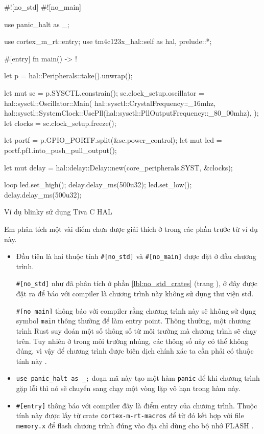 \begin{listing}[ht]
\begin{rustcode}
#![no_std]
#![no_main]

use panic_halt as _;

use cortex_m_rt::entry;
use tm4c123x_hal::{self as hal, prelude::*};

#[entry]
fn main() -> ! {
    let p = hal::Peripherals::take().unwrap();

    let mut sc = p.SYSCTL.constrain();
    sc.clock_setup.oscillator = hal::sysctl::Oscillator::Main(
        hal::sysctl::CrystalFrequency::_16mhz,
        hal::sysctl::SystemClock::UsePll(hal::sysctl::PllOutputFrequency::_80_00mhz),
    );
    let clocks = sc.clock_setup.freeze();

    let portf = p.GPIO_PORTF.split(&sc.power_control);
    let mut led = portf.pf1.into_push_pull_output();

    let mut delay = hal::delay::Delay::new(core_peripherals.SYST, &clocks);

    loop {
        led.set_high();
        delay.delay_ms(500u32);
        led.set_low();
        delay.delay_ms(500u32);
    }
}
\end{rustcode}
\caption{Ví dụ blinky sử dụng Tiva C HAL}
\label{code:tivac_hal_blinky}
\end{listing}

Em phân tích một vài điểm chưa được giải thích ở trong các phần trước từ ví dụ này.

\begin{itemize}
    \item Đầu tiên là hai thuộc tính \texttt{#[no_std]} và \texttt{#[no_main]} được đặt ở đầu chương trình.

        \texttt{#[no_std]} như đã phân tích ở phần \ref{lbl:no_std_crates} (trang \pageref{lbl:no_std_crates}), ở đây được đặt ra để báo với compiler là chương trình này không sử dụng thư viện std.

    \texttt{#[no_main]} thông báo với compiler rằng chương trình này sẽ không sử dụng symbol \texttt{main} thông thường để làm entry point. Thông thường, một chương trình Rust suy đoán một số thông số từ môi trường mà chương trình sẽ chạy trên. Tuy nhiên ở trong môi trường nhúng, các thông số này có thể không đúng, vì vậy để chương trình được biên dịch chính xác ta cần phải có thuộc tính này \cite{rust_reference, embedonomicon}.

    \item \texttt{use panic_halt as _;} đoạn mã này tạo một hàm \texttt{panic} để khi chương trình gặp lỗi thì nó sẽ chuyển sang chạy một vòng lặp vô hạn trong hàm này.
    \item \texttt{#[entry]} thông báo với compiler đây là điểm entry của chương trình.
        Thuộc tính này được lấy từ crate \texttt{cortex-m-rt-macros} để từ đó kết hợp với file \texttt{memory.x} để flash chương trình đúng vào địa chỉ dùng cho bộ nhớ FLASH \cite{cortex_m_rt}.
\end{itemize}

